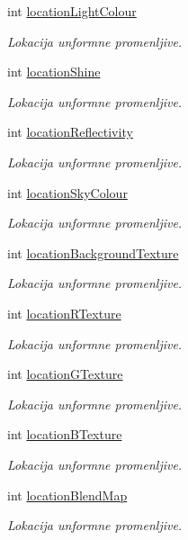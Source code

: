 \begin{DoxyCompactItemize}
int \hyperlink{classshader_1_1TerrainShader_aaadb97ab6d82972d24e744cf1f2d0bb1}{location\+Light\+Colour}
\begin{DoxyCompactList}\small\item\em Lokacija unformne promenljive. \end{DoxyCompactList}\item 
int \hyperlink{classshader_1_1TerrainShader_a8d59890fc8cc4309b3983278a105574e}{location\+Shine}
\begin{DoxyCompactList}\small\item\em Lokacija unformne promenljive. \end{DoxyCompactList}\item 
int \hyperlink{classshader_1_1TerrainShader_afd0f73e3f6e4f78e98073f2669f71a7d}{location\+Reflectivity}
\begin{DoxyCompactList}\small\item\em Lokacija unformne promenljive. \end{DoxyCompactList}\item 
int \hyperlink{classshader_1_1TerrainShader_afaff06ee8890773c6254db93fe3736ff}{location\+Sky\+Colour}
\begin{DoxyCompactList}\small\item\em Lokacija unformne promenljive. \end{DoxyCompactList}\item 
int \hyperlink{classshader_1_1TerrainShader_ab8c3ffdad973abf2b26591aaf4cb64d1}{location\+Background\+Texture}
\begin{DoxyCompactList}\small\item\em Lokacija unformne promenljive. \end{DoxyCompactList}\item 
int \hyperlink{classshader_1_1TerrainShader_acae2f0402eff8bc08c3015e860e2e413}{location\+R\+Texture}
\begin{DoxyCompactList}\small\item\em Lokacija unformne promenljive. \end{DoxyCompactList}\item 
int \hyperlink{classshader_1_1TerrainShader_ae08f66a1b8e6fbe615fd24fc1e5fff20}{location\+G\+Texture}
\begin{DoxyCompactList}\small\item\em Lokacija unformne promenljive. \end{DoxyCompactList}\item 
int \hyperlink{classshader_1_1TerrainShader_a097eb6e1afc654c99f8c703e3091fe95}{location\+B\+Texture}
\begin{DoxyCompactList}\small\item\em Lokacija unformne promenljive. \end{DoxyCompactList}\item 
int \hyperlink{classshader_1_1TerrainShader_a2fce0f97cafe09a59b828c1b777b3f41}{location\+Blend\+Map}
\begin{DoxyCompactList}\small\item\em Lokacija unformne promenljive. \end{DoxyCompactList}\end{DoxyCompactItemize}


